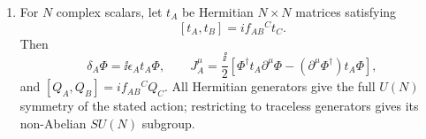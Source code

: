 \begin{enumerate}
\begin{enumerate}
\[ \Phi^\dagger t_i\partial^\mu\Phi
 -(\partial^\mu\Phi^\dagger)t_i\Phi\right].
\]
The field equations make \(\partial_\mu J_i^\mu=0\); the two potential
terms cancel because \(V\) depends only on \(\Phi^\dagger\Phi\).
Using \(\partial^0=-\partial_t\) and the canonical momenta,
\[
 \int \dd^dx\,J_i^0
 =\ii\int \dd^dx\left[
 \Pi_\alpha(t_i)_{\alpha\beta}\Phi_\beta
 -\Phi_\alpha^\dagger(t_i)_{\alpha\beta}
  \Pi_\beta^\dagger\right]
 =Q^i,
\]
as required.
\item
For \(N\) complex scalars, let \(t_A\) be Hermitian \(N\times N\)
matrices satisfying
\[
 [t_A,t_B]=if_{AB}{}^Ct_C.
\]
Then
\[
 \delta_A\Phi=\ii\epsilon_A t_A\Phi,\qquad
 J_A^\mu=\frac{\ii}{2}\left[
 \Phi^\dagger t_A\partial^\mu\Phi
 -(\partial^\mu\Phi^\dagger)t_A\Phi\right],
\]
and
\([Q_A,Q_B]=if_{AB}{}^CQ_C\).
All Hermitian generators give the full \(U(N)\) symmetry of the stated
action; restricting to traceless generators gives its non-Abelian
\(SU(N)\) subgroup.
\end{enumerate}


\end{enumerate}
